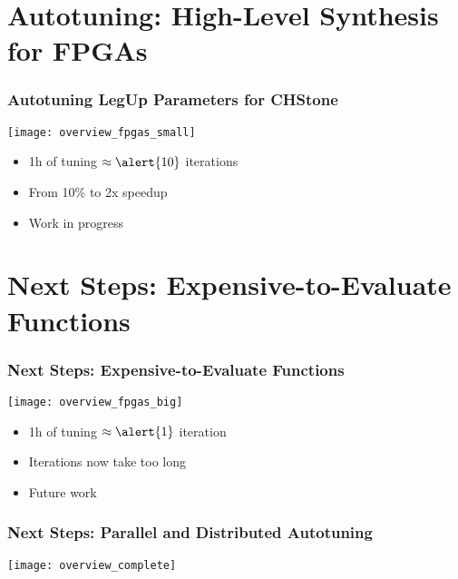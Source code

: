 \documentclass[10pt, compress, aspectratio=169]{beamer}
\begin{document}
\section{Autotuning: High-Level Synthesis for FPGAs}

\begin{frame}
    \frametitle{Autotuning LegUp Parameters for CHStone}
    \begin{center}
        \texttt{[image: overview\_fpgas\_small]}
    \end{center}

    \begin{itemize}
        \item \alert{1h} of tuning $\approx \alert{10}$ \alert{iterations}
        \item From \alert{10\% to 2x speedup}
        \item Work in progress
    \end{itemize}
\end{frame}

\section{Next Steps: Expensive-to-Evaluate Functions}

\begin{frame}
    \frametitle{Next Steps: Expensive-to-Evaluate Functions}
    \begin{center}
        \texttt{[image: overview\_fpgas\_big]}
    \end{center}

    \begin{itemize}
        \item \alert{1h} of tuning $\approx \alert{1}$ \alert{iteration}
        \item Iterations now \alert{take too long}
        \item Future work
    \end{itemize}
\end{frame}

\begin{frame}
    \frametitle{Next Steps: Parallel and Distributed Autotuning}
    \begin{center}
        \texttt{[image: overview\_complete]}
    \end{center}
\end{frame}
\end{document}
